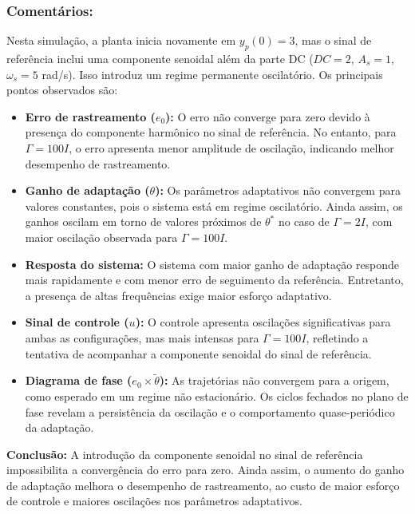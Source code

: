 \documentclass[10pt]{article}
\begin{document}
\subsubsection{Comentários:}

Nesta simulação, a planta inicia novamente em $y_p(0)=3$, mas o sinal de referência inclui uma componente senoidal além da parte DC ($DC=2$, $A_s=1$, $\omega_s=5$ rad/s). Isso introduz um regime permanente oscilatório. Os principais pontos observados são:

\begin{itemize}
    \item \textbf{Erro de rastreamento ($e_0$):} O erro não converge para zero devido à presença do componente harmônico no sinal de referência. No entanto, para $\Gamma = 100I$, o erro apresenta menor amplitude de oscilação, indicando melhor desempenho de rastreamento.

    \item \textbf{Ganho de adaptação ($\theta$):} Os parâmetros adaptativos não convergem para valores constantes, pois o sistema está em regime oscilatório. Ainda assim, os ganhos oscilam em torno de valores próximos de $\theta^*$ no caso de $\Gamma = 2I$, com maior oscilação observada para $\Gamma = 100I$.

    \item \textbf{Resposta do sistema:} O sistema com maior ganho de adaptação responde mais rapidamente e com menor erro de seguimento da referência. Entretanto, a presença de altas frequências exige maior esforço adaptativo.

    \item \textbf{Sinal de controle ($u$):} O controle apresenta oscilações significativas para ambas as configurações, mas mais intensas para $\Gamma = 100I$, refletindo a tentativa de acompanhar a componente senoidal do sinal de referência.

    \item \textbf{Diagrama de fase ($e_0 \times \tilde{\theta}$):} As trajetórias não convergem para a origem, como esperado em um regime não estacionário. Os ciclos fechados no plano de fase revelam a persistência da oscilação e o comportamento quase-periódico da adaptação.

\end{itemize}

\textbf{Conclusão:} A introdução da componente senoidal no sinal de referência impossibilita a convergência do erro para zero. Ainda assim, o aumento do ganho de adaptação melhora o desempenho de rastreamento, ao custo de maior esforço de controle e maiores oscilações nos parâmetros adaptativos.
\end{document}
